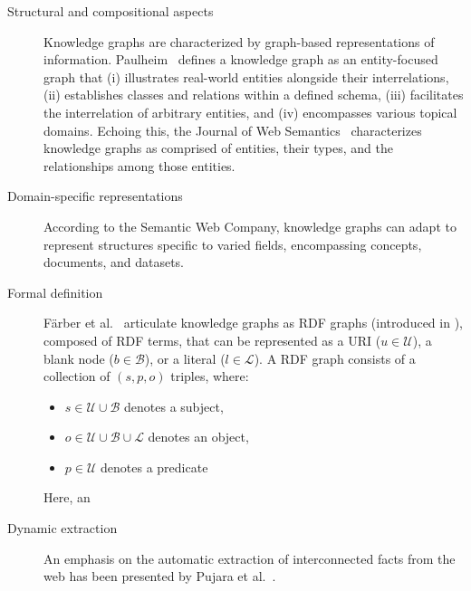 \begin{description}
    \item[Structural and compositional aspects] Knowledge graphs are characterized by graph-based representations of information. Paulheim~\cite{Paulheim2016KnowledgeGR} defines a knowledge graph as an entity-focused graph that (i) illustrates real-world entities alongside their interrelations, (ii) establishes classes and relations within a defined schema, (iii) facilitates the interrelation of arbitrary entities, and (iv) encompasses various topical domains. Echoing this, the Journal of Web Semantics~\cite{Kroetsch2016knowledge} characterizes knowledge graphs as comprised of entities, their types, and the relationships among those entities.
    
    \item[Domain-specific representations] According to the Semantic Web Company, knowledge graphs can adapt to represent structures specific to varied fields, encompassing concepts, documents, and datasets.    
    
        \item[Formal definition] Färber et al.~\cite{Farber2016linked} articulate knowledge graphs as RDF graphs (introduced in ), composed of RDF terms, that can be represented as a URI ($u\in \mathcal{U}$), a blank node ($b\in \mathcal{B}$), or a literal ($l\in \mathcal{L}$). A RDF graph consists of a collection of $(s, p, o)$ triples, where:
    \begin{itemize}
        \item $s\in \mathcal{U} \cup \mathcal{B}$ denotes a subject,
        \item $o\in \mathcal{U}\cup \mathcal{B}\cup \mathcal{L}$ denotes an object,
        \item $p\in \mathcal{U}$ denotes a predicate
    \end{itemize}
    Here, an 
    
    \item[Dynamic extraction] An emphasis on the automatic extraction of interconnected facts from the web has been presented by Pujara et al.~\cite{Pujara2013KGIdentification}.
\end{description}

